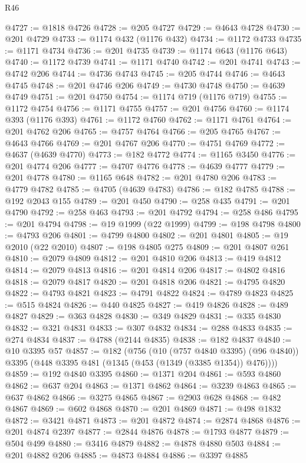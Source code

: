 \begin{lexlean}{R46}
\begin{coremodule}
@4727 := @1818 @4726
@4728 := @205 @4727
@4729 := @4643 @4728
@4730 := @201 @4729
@4733 := @1174 @432 (@1176 @432)
@4734 := @1172 @4733
@4735 := @1171 @4734
@4736 := @201 @4735
@4739 := @1174 @643 (@1176 @643)
@4740 := @1172 @4739
@4741 := @1171 @4740
@4742 := @201 @4741
@4743 := @4742 @206
@4744 := @4736 @4743
@4745 := @205 @4744
@4746 := @4643 @4745
@4748 := @201 @4746 @206
@4749 := @4730 @4748
@4750 := @4639 @4749
@4751 := @201 @4750
@4754 := @1174 @719 (@1176 @719)
@4755 := @1172 @4754
@4756 := @1171 @4755
@4757 := @201 @4756
@4760 := @1174 @393 (@1176 @393)
@4761 := @1172 @4760
@4762 := @1171 @4761
@4764 := @201 @4762 @206
@4765 := @4757 @4764
@4766 := @205 @4765
@4767 := @4643 @4766
@4769 := @201 @4767 @206
@4770 := @4751 @4769
@4772 := @4637 (@4639 @4770)
@4773 := @182 @4772
@4774 := @1165 @3450
@4776 := @201 @4774 @206
@4777 := @4707 @4776
@4778 := @4639 @4777
@4779 := @201 @4778
@4780 := @1165 @648
@4782 := @201 @4780 @206
@4783 := @4779 @4782
@4785 := @4705 (@4639 @4783)
@4786 := @182 @4785
@4788 := @192 @2043 @155
@4789 := @201 @450
@4790 := @258 @435
@4791 := @201 @4790
@4792 := @258 @463
@4793 := @201 @4792
@4794 := @258 @486
@4795 := @201 @4794
@4798 := @19 @1999 (@22 @1999)
@4799 := @198 @4798
@4800 := @4793 @206
@4801 := @4799 @4800
@4802 := @201 @4801
@4805 := @19 @2010 (@22 @2010)
@4807 := @198 @4805 @275
@4809 := @201 @4807 @261
@4810 := @2079 @4809
@4812 := @201 @4810 @206
@4813 := @419 @4812
@4814 := @2079 @4813
@4816 := @201 @4814 @206
@4817 := @4802 @4816
@4818 := @2079 @4817
@4820 := @201 @4818 @206
@4821 := @4795 @4820
@4822 := @4793 @4821
@4823 := @4791 @4822
@4824 := @4789 @4823
@4825 := @515 @4824
@4826 := @440 @4825
@4827 := @419 @4826
@4828 := @489 @4827
@4829 := @363 @4828
@4830 := @349 @4829
@4831 := @335 @4830
@4832 := @321 @4831
@4833 := @307 @4832
@4834 := @288 @4833
@4835 := @274 @4834
@4837 := @4788 (@2144 @4835)
@4838 := @182 @4837
@4840 := @10 @3395 @57
@4857 := @182
    (@756
      (@10 (@757 @4840 @3395) (@96 @4840))
      @3395
      (@448 @3395 @481 (@1345 (@453 (@1349 (@3385 @1354)) @476))))
@4859 := @192 @4840 @3395
@4860 := @1371 @204
@4861 := @593 @4860
@4862 := @637 @204
@4863 := @1371 @4862
@4864 := @3239 @4863
@4865 := @637 @4862
@4866 := @3275 @4865
@4867 := @2903 @628
@4868 := @482 @4867
@4869 := @602 @4868
@4870 := @201 @4869
@4871 := @498 @1832
@4872 := @3421 @4871
@4873 := @201 @4872
@4874 := @2874 @4868
@4876 := @201 @4874 @2397
@4877 := @2844 @4876
@4878 := @1793 @4877
@4879 := @504 @499
@4880 := @3416 @4879
@4882 := @4878 @4880 @503
@4884 := @201 @4882 @206
@4885 := @4873 @4884
@4886 := @3397 @4885

\end{coremodule}
\end{lexlean}
